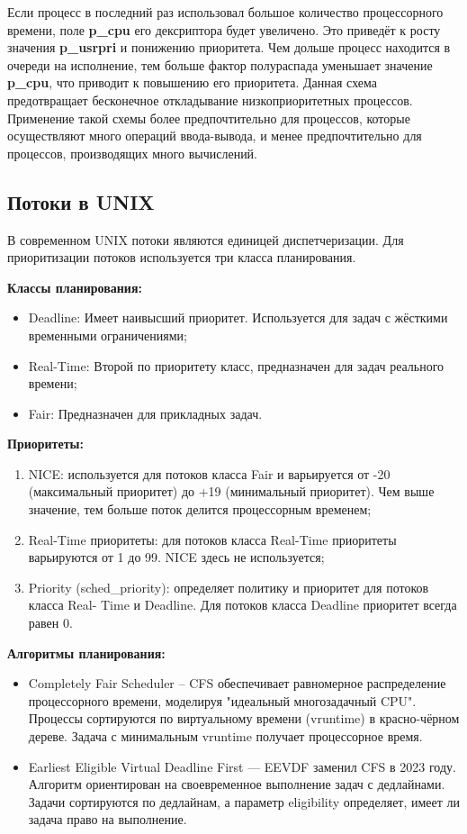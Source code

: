 Если процесс в последний раз использовал большое количество процессорного времени,
поле \textbf{p\_cpu} его дексриптора будет увеличено. Это приведёт к росту значения \textbf{p\_usrpri} и понижению приоритета.
Чем дольше процесс находится в очереди на исполнение, тем больше фактор полураспада
уменьшает значение \textbf{p\_cpu}, что приводит к повышению его приоритета. Данная схема предотвращает
бесконечное откладывание низкоприоритетных процессов. Применение такой схемы более
предпочтительно для процессов, которые осуществляют много операций ввода-вывода, и менее предпочтительно для процессов, производящих много вычислений.

\subsection{Потоки в UNIX}
В современном UNIX потоки являются единицей диспетчеризации. Для приоритизации
потоков используется три класса планирования.

\textbf{Классы планирования:}
\begin{itemize}
    \item Deadline: Имеет наивысший приоритет. Используется для задач с жёсткими временными ограничениями;
    \item Real-Time: Второй по приоритету класс, предназначен для задач реального времени;
    \item Fair: Предназначен для прикладных задач.

\end{itemize}

\textbf{Приоритеты:}
\begin{enumerate}
    \item NICE: используется для потоков класса Fair и варьируется от -20 (максимальный приоритет) до +19 (минимальный приоритет). Чем выше значение, тем больше поток делится процессорным временем;
\item Real-Time приоритеты: для потоков класса Real-Time приоритеты варьируются от 1
до 99. NICE здесь не используется;
\item  Priority (sched\_priority): определяет политику и приоритет для потоков класса Real-
Time и Deadline. Для потоков класса Deadline приоритет всегда равен 0.

\end{enumerate}

\textbf{Алгоритмы планирования:}
\begin{itemize}
    \item Completely Fair Scheduler – CFS обеспечивает равномерное распределение
процессорного времени, моделируя "идеальный многозадачный CPU". Процессы
сортируются по виртуальному времени (vruntime) в красно-чёрном дереве. Задача с
минимальным vruntime получает процессорное время.
 \item Earliest Eligible Virtual Deadline First --- EEVDF заменил CFS в 2023 году. Алгоритм
ориентирован на своевременное выполнение задач с дедлайнами. Задачи сортируются
по дедлайнам, а параметр eligibility определяет, имеет ли задача право на выполнение.

\end{itemize}

